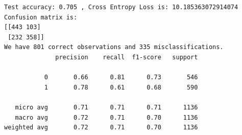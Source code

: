 \documentclass[8pt,onecolumn,aps,pra]{revtex4-1}
\begin{document}
    \begin{Verbatim}[commandchars=\\\{\}]
Test accuracy: 0.705 , Cross Entropy Loss is: 10.185363072914074
Confusion matrix is:
[[443 103]
 [232 358]]
We have 801 correct observations and 335 misclassifications.
              precision    recall  f1-score   support

           0       0.66      0.81      0.73       546
           1       0.78      0.61      0.68       590

   micro avg       0.71      0.71      0.71      1136
   macro avg       0.72      0.71      0.70      1136
weighted avg       0.72      0.71      0.70      1136


    \end{Verbatim}

    \begin{center}
    \end{center}
    { \hspace*{\fill} \\}
    
    \begin{center}
    \end{center}
    { \hspace*{\fill} \\}
    
\end{document}
